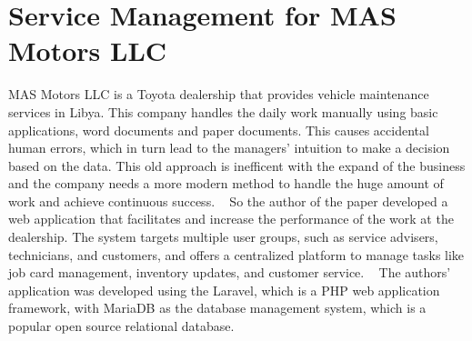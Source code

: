 

\section{Service Management for MAS Motors LLC}

MAS Motors LLC is a Toyota dealership that provides vehicle maintenance services in Libya.
This company handles the daily work manually using basic applications, word documents and paper documents.
This causes accidental human errors, which in turn lead to the managers' intuition to make a decision based on the data.
This old approach is inefficent with the expand of the business and the company needs a more modern method to handle the huge amount of work and achieve continuous success. ~\cite{MAS_MOTORS}
So the author of the paper developed a web application that facilitates and increase the performance of the work at the dealership.
The system targets multiple user groups, such as service advisers, technicians, and customers, and offers a centralized platform to manage tasks like job card management, inventory updates, and customer service. ~\cite{MAS_MOTORS}
The authors' application was developed using the Laravel, which is a PHP web application framework, with MariaDB as the database management system, which is a popular open source relational database.

